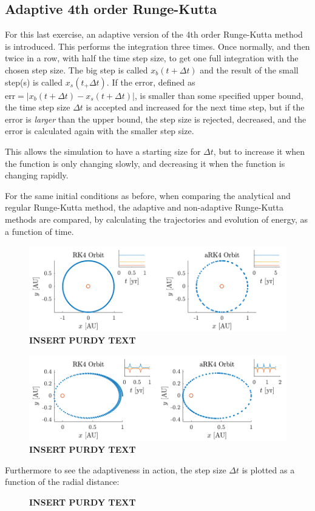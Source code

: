 \documentclass[a4paper,10pt]{article} 	%
\numberwithin{equation}{section}
\begin{document}
	\subsection{Adaptive 4th order Runge-Kutta}
	For this last exercise, an adaptive version of the 4th order Runge-Kutta method is introduced. This performs the integration three times. Once normally, and then twice in a row, with half the time step size, to get one full integration with the chosen step size. The big step is called $ x_b(t+\Delta t) $ and the result of the small step(s) is called $ x_s(t_+\Delta t) $. If the error, defined as $ \text{err} = |x_b(t+\Delta t)-x_s(t+\Delta t) |$, is smaller than some specified upper bound, the time step size $ \Delta t $ is accepted and increased for the next time step, but if the error is \textit{larger} than the upper bound, the step size is rejected, decreased, and the error is calculated again with the smaller step size.
	
	This allows the simulation to have a starting size for $ \Delta t $, but to increase it when the function is only changing slowly, and decreasing it when the function is changing rapidly. 
	
	For the same initial conditions as before, when comparing the analytical and regular Runge-Kutta method, the adaptive and non-adaptive Runge-Kutta methods are compared, by calculating the trajectories and evolution of energy, as a function of time.
	\begin{figure}[H]
		\centering
		\includegraphics[width = \linewidth]{RK42pi.pdf}
		\caption{\textbf{INSERT PURDY TEXT}}
		\label{fig:KeplerAdaptive1}
	\end{figure}
	\begin{figure}[H]
		\centering
		\includegraphics[width = \linewidth]{RK41pi.pdf}
		\caption{\textbf{INSERT PURDY TEXT}}
		\label{fig:KeplerAdaptive2}
	\end{figure}
	
	Furthermore to see the adaptiveness in action, the step size $ \Delta t$ is plotted as a function of the radial distance:
	
	\begin{figure}[H]
		\centering
		\caption{\textbf{INSERT PURDY TEXT}}
		\label{fig:KeplerAdaptiveDT}
	\end{figure}
	
	
\end{document}
